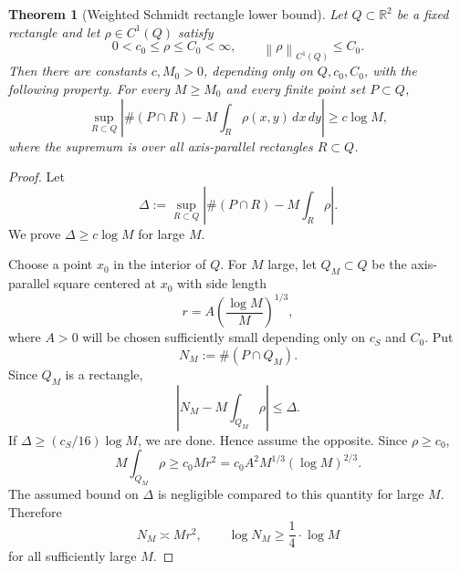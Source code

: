 \documentclass[10pt,a4paper]{amsart}
\newtheorem{theorem}{Theorem}
\newcommand{\R}{\mathbb R}
\newcommand{\norm}[1]{\left\|#1\right\|}
\begin{document}
\begin{theorem}[Weighted Schmidt rectangle lower bound]\label{thm:weighted-schmidt}
Let $Q\subset\R^2$ be a fixed rectangle and let $\rho\in C^1(Q)$ satisfy
\[
        0<c_0\le \rho\le C_0<\infty,
        \qquad
        \norm{\rho}_{C^1(Q)}\le C_0.
\]
Then there are constants $c,M_0>0$, depending only on $Q,c_0,C_0$, with the following property. For every $M\ge M_0$ and every finite point set $P\subset Q$,
\[
        \sup_{R\subset Q}
        \left|
        \#(P\cap R)-M\int_R\rho(x,y)\,dx\,dy
        \right|
        \ge c\log M,
\]
where the supremum is over all axis-parallel rectangles $R\subset Q$.
\end{theorem}

\begin{proof}
Let
\[
        \Delta:=\sup_{R\subset Q}
        \left|
        \#(P\cap R)-M\int_R\rho
        \right|.
\]
We prove $\Delta\ge c\log M$ for large $M$.

\bigskip
\noindent
Choose a point $x_0$ in the interior of $Q$.  For $M$ large, let $Q_M\subset Q$ be the axis-parallel square centered at $x_0$ with side length
\[
        r=A\left(\frac{\log M}{M}\right)^{1/3},
\]
where $A>0$ will be chosen sufficiently small depending only on $c_S$ and $C_0$.  Put
\[
        N_M:=\#(P\cap Q_M).
\]
Since $Q_M$ is a rectangle,
\begin{equation}\label{eq:local-mass-control-schmidt}
        \left|N_M-M\int_{Q_M}\rho\right|\le \Delta.
\end{equation}
If $\Delta\ge (c_S/16)\log M$, we are done.  Hence assume the opposite.  Since $\rho\ge c_0$,
\[
        M\int_{Q_M}\rho
        \ge c_0Mr^2
        =c_0A^2M^{1/3}(\log M)^{2/3}.
\]
The assumed bound on $\Delta$ is negligible compared to this quantity for large $M$.  Therefore
\[
        N_M\asymp Mr^2,
        \qquad
        \log N_M\ge \frac14\cdot\log M
\]
for all sufficiently large $M$.


\end{proof}
\end{document}
